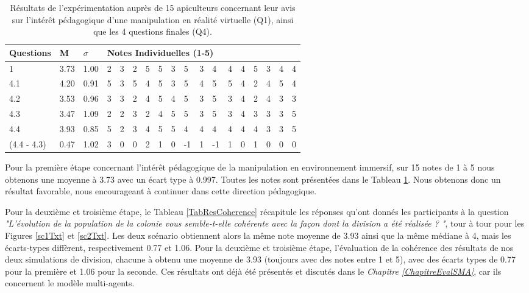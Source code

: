 	\begin{table}
	\centering
	\begin{tabular}{|l|l|l|lllllllllllllll|}
	\hline
	\textbf{Questions} & \textbf{M} & \textbf{$\sigma$} & \multicolumn{15}{l}{\textbf{Notes Individuelles (1-5)}}\\
	\hline
	1 & 3.73 & 1.00          &2&3&2&5&5&3&5&3&4&4&4&5&3&4&4\\
	\hline
	4.1 & 4.20 & 0.91        &5&3&5&4&5&3&5&4&5&5&4&2&4&5&4\\
	\hline
	4.2 & 3.53 & 0.96        &3&3&2&4&5&4&5&3&5&3&4&2&4&3&3\\
	\hline
	4.3 & 3.47 & 1.09        &2&2&3&2&4&5&5&3&5&3&4&3&3&3&5\\
	\hline
	4.4 & 3.93 & 0.85        &5&2&3&4&5&5&4&4&4&4&4&4&3&3&5\\
	\hline
	(4.4 - 4.3) & 0.47 & 1.02&3&0&0&2&1&0&-1&1&-1&1&0&1&0&0&0\\
	\hline
	\end{tabular}
	\caption{Résultats de l'expérimentation auprès de 15 apiculteurs concernant leur avis sur l'intérêt pédagogique d'une manipulation en réalité virtuelle (Q1), ainsi que les 4 questions finales (Q4).}
	\label{TabResVR}
	\end{table}	
	
	Pour la première étape concernant l'intérêt pédagogique de la manipulation en environnement immersif, sur 15 notes de 1 à 5 nous obtenons une moyenne à 3.73 avec un écart type à 0.997. Toutes les notes sont présentées dans le Tableau \ref{TabResVR}. Nous obtenons donc un résultat favorable, nous encourageant à continuer dans cette direction pédagogique.
	
    
	
	Pour la deuxième et troisième étape, le Tableau \ref{TabResCoherence} récapitule les réponses qu'ont donnés les participants à la question \textit{"L'évolution de la population de la colonie vous semble-t-elle cohérente avec la façon dont la division a été réalisée ? "}, tour à tour pour les Figures \ref{sc1Txt} et \ref{sc2Txt}. Les deux scénario obtiennent alors la même note moyenne de 3.93 ainsi que la même médiane à 4, mais les écarts-types diffèrent, respectivement 0.77 et 1.06.
	Pour la deuxième et troisième étape, l'évaluation de la cohérence des résultats de nos deux simulations de division, chacune à obtenu une moyenne de 3.93 (toujours avec des notes entre 1 et 5), avec des écarts types de 0.77 pour la première et 1.06 pour la seconde. Ces résultats ont déjà été présentés et discutés dans le \textit{Chapitre \ref{ChapitreEvalSMA}}, car ils concernent le modèle multi-agents.
    
